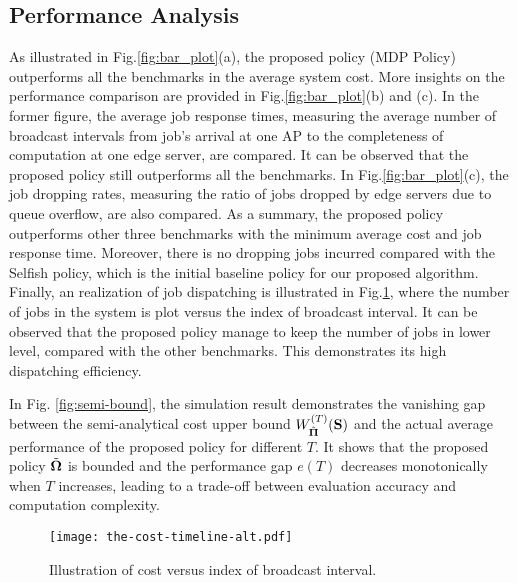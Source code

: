 \subsection{Performance Analysis}
\label{subsec:basic}
As illustrated in Fig.\ref{fig:bar_plot}(a), the proposed policy (MDP Policy) outperforms all the benchmarks in the average system cost.
More insights on the performance comparison are provided in Fig.\ref{fig:bar_plot}(b) and (c).
In the former figure, the average job response times, measuring the average number of broadcast intervals from job's arrival at one AP to the completeness of computation at one edge server, are compared.
It can be observed that the proposed policy still outperforms all the benchmarks.
In Fig.\ref{fig:bar_plot}(c), the job dropping rates, measuring the ratio of jobs dropped by edge servers due to queue overflow, are also compared.
As a summary, the proposed policy outperforms other three benchmarks with the minimum average cost and job response time.
{Moreover, there is no dropping jobs incurred compared with the Selfish policy, which is the initial baseline policy for our proposed algorithm.}
Finally, an realization of job dispatching is illustrated in Fig.\ref{fig:general_timeline}, where the number of jobs in the system is plot versus the index of broadcast interval.
It can be observed that the proposed policy manage to keep the number of jobs in lower level, compared with the other benchmarks.
This demonstrates its high dispatching efficiency.

{
    In Fig. \ref{fig:semi-bound}, the simulation result demonstrates the vanishing gap between the semi-analytical cost upper bound $W^{(T)}_{\hat{\boldsymbol{\Pi}}}(\mathbf{S})$ and the actual average performance of the proposed policy for different $T$.
    It shows that the proposed policy $\tilde{\boldsymbol{\Omega}}$ is bounded and the performance gap $e(T)$ decreases monotonically when $T$ increases, leading to a trade-off between evaluation accuracy and computation complexity.
}%

\begin{figure}[ht!]                                                                             %
    \centering                                                                                  %
    \texttt{[image: the-cost-timeline-alt.pdf]}                     %
    \caption{Illustration of cost versus index of broadcast interval.}
    \label{fig:general_timeline}                                                                %
\end{figure}                                                                                    %

